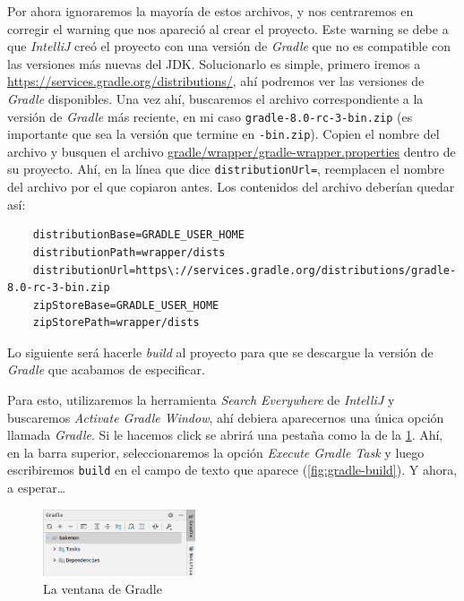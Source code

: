   Por ahora ignoraremos la mayoría de estos archivos, y nos centraremos en corregir el warning
  que nos apareció al crear el proyecto.
  Este warning se debe a que \textit{IntelliJ} creó el proyecto con una versión de \textit{Gradle}
  que no es compatible con las versiones más nuevas del JDK.
  Solucionarlo es simple, primero iremos a \url{https://services.gradle.org/distributions/}, ahí
  podremos ver las versiones de \textit{Gradle} disponibles.
  Una vez ahí, buscaremos el archivo correspondiente a la versión de \textit{Gradle} más reciente,
  en mi caso \texttt{gradle-8.0-rc-3-bin.zip} (es importante que sea la versión que termine en
  \texttt{-bin.zip}).
  Copien el nombre del archivo y busquen el archivo \url{gradle/wrapper/gradle-wrapper.properties}
  dentro de su proyecto.
  Ahí, en la línea que dice \texttt{distributionUrl=}, reemplacen el nombre del archivo por el
  que copiaron antes.
  Los contenidos del archivo deberían quedar así:

  \begin{verbatim}
    distributionBase=GRADLE_USER_HOME
    distributionPath=wrapper/dists
    distributionUrl=https\://services.gradle.org/distributions/gradle-8.0-rc-3-bin.zip
    zipStoreBase=GRADLE_USER_HOME
    zipStorePath=wrapper/dists
  \end{verbatim}

  Lo siguiente será hacerle \textit{build} al proyecto para que se descargue la versión de
  \textit{Gradle} que acabamos de especificar.

  Para esto, utilizaremos la herramienta \textit{Search Everywhere} de \textit{IntelliJ} y 
  buscaremos \textit{Activate Gradle Window}, ahí debiera aparecernos una única opción llamada 
  \textit{Gradle}.
  Si le hacemos click se abrirá una pestaña como la de la \cref{fig:gradle-window}.
  Ahí, en la barra superior, seleccionaremos la opción \textit{Execute Gradle Task} y luego
  escribiremos \texttt{build} en el campo de texto que aparece (\cref{fig:gradle-build}).
  Y ahora, a esperar\dots

  \begin{figure}[ht!]
    \centering
    \includegraphics[width=0.4\textwidth]{img/oop/tdd/gradle/gradle-window.png}
    \caption{La ventana de Gradle}
    \label{fig:gradle-window}
  \end{figure}

